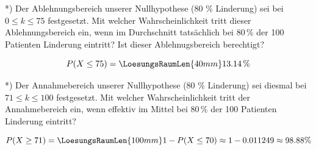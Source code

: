 *) Der Ablehnungsbereich unserer Nullhypothese (80 \% Linderung) sei bei
$0 \le k \le 75$ festgesetzt. Mit welcher Wahrscheinlichkeit tritt
dieser Ablehnungsbereich ein, wenn im Durchschnitt tatsächlich bei 80\,\% der 100
Patienten Linderung eintritt? Ist dieser Ablehnugsbereich berechtigt?

$$P(X \le 75) = \LoesungsRaumLen{40mm}{13.14\,\%}$$


*) Der Annahmebereich unserer Nullhypothese (80 \% Linderung) sei
diesmal bei $71 \le k \le 100$ festgesetzt. Mit welcher Wahrscheinlichkeit tritt
der Annahmebereich ein, wenn effektiv im Mittel bei 80\,\% der 100
Patienten Linderung eintritt?

$$P(X \ge 71) = \LoesungsRaumLen{100mm}{1 - P(X \le 70) \approx 1 - 0.011249 \approx 98.88\%}$$


\newpage
